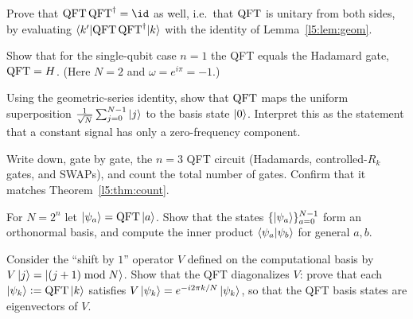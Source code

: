 \begin{exercise}\label{l5:ex:p2}
Prove that $\QFT\,\QFT^{\dagger} = \id$ as well, i.e.\ that $\mathrm{QFT}$ is unitary from
both sides, by evaluating $\braket{k'|\mathrm{QFT}\,\mathrm{QFT}^{\dagger}|k}$ with the identity
of Lemma~\ref{l5:lem:geom}.
\end{exercise}

\begin{exercise}\label{l5:ex:p3}
Show that for the single-qubit case $n=1$ the QFT equals the Hadamard gate,
$\mathrm{QFT} = H$. (Here $N=2$ and $\omega = e^{i\pi} = -1$.)
\end{exercise}

\begin{exercise}\label{l5:ex:p4}
Using the geometric-series identity, show that $\mathrm{QFT}$ maps the uniform
superposition $\tfrac{1}{\sqrt N}\sum_{j=0}^{N-1}\ket{j}$ to the basis state
$\ket{0}$. Interpret this as the statement that a constant signal has only a
zero-frequency component.
\end{exercise}

\begin{exercise}\label{l5:ex:p5}
Write down, gate by gate, the $n=3$ QFT circuit (Hadamards, controlled-$R_k$
gates, and SWAPs), and count the total number of gates. Confirm that it matches
Theorem~\ref{l5:thm:count}.
\end{exercise}

\begin{exercise}\label{l5:ex:p6}
For $N=2^n$ let $\ket{\psi_a} = \mathrm{QFT}\ket{a}$. Show that the states
$\{\ket{\psi_a}\}_{a=0}^{N-1}$ form an orthonormal basis, and compute the inner
product $\braket{\psi_a|\psi_b}$ for general $a,b$.
\end{exercise}

\begin{exercise}\label{l5:ex:p7}
Consider the ``shift by $1$'' operator $V$ defined on the computational basis by
$V\ket{j} = \ket{(j+1)\bmod N}$. Show that the QFT diagonalizes $V$: prove that
each $\ket{\psi_k} \vcentcolon= \mathrm{QFT}\ket{k}$ satisfies
$V\ket{\psi_k} = e^{-i2\pi k/N}\ket{\psi_k}$, so that the QFT basis states are
eigenvectors of $V$.
\end{exercise}

